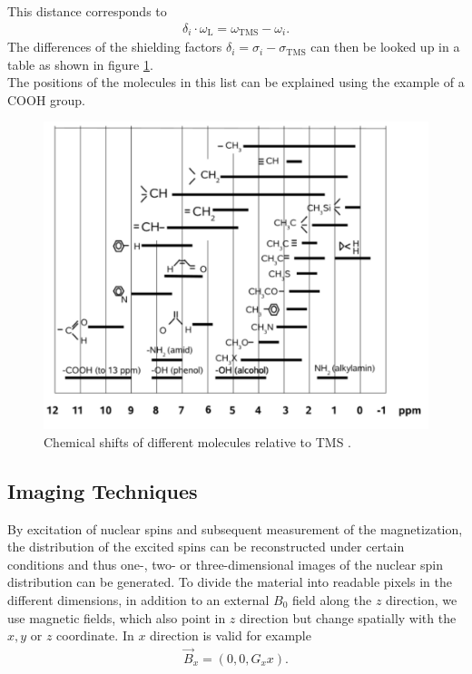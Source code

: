 This distance corresponds to
\begin{align}
\delta_i\cdot\omega_\text{L}=\omega_\text{TMS}-\omega_i.
\label{eq:shift}
\end{align}
The differences of the shielding factors $\delta_i =\sigma_i-\sigma_\text{TMS}$ can then be looked up in a table as shown in figure \ref{fig:shift}.\\
The positions of the molecules in this list can be explained using the example of a COOH group.
\begin{figure}[ht]
\centering
\includegraphics[scale=.175]{images//shift.png}
\caption{Chemical shifts of different molecules relative to TMS \cite{script_nmr}.}
\label{fig:shift}
\end{figure}



\subsection{Imaging Techniques}
By excitation of nuclear spins and subsequent measurement of the magnetization, the distribution of the excited spins can be reconstructed under certain conditions and thus one-, two- or three-dimensional images of the nuclear spin distribution can be generated.
To divide the material into readable pixels in the different dimensions, in addition to an external $B_0$ field along the $z$ direction, we use magnetic fields, which also point in $z$ direction but change spatially with the $x, y$ or $z$ coordinate.
In $x$ direction is valid for example
\begin{align*}
\vec{B}_x=(0,0,G_xx).
\end{align*}

